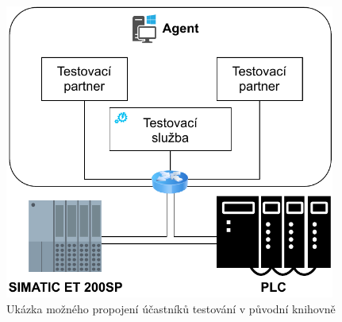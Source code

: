 \begin{figure}[htbp]
    \centering 
    \includegraphics[width=0.97\textwidth]{assets/img/bp_assets/devicemodel.pdf}
    \caption{Ukázka možného propojení účastníků testování v původní knihovně}
    \label{fig:bp_devicemodel}
\end{figure}

